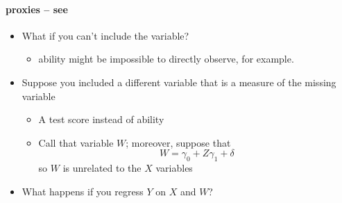 \paragraph{proxies -- see \citet[Section 12.5]{Gre12}}
\begin{itemize}
\item What if you can't include the variable?
\begin{itemize}
\item ability might be impossible to directly observe, for
            example.
\end{itemize}
\item Suppose you included a different variable that is a measure
          of the missing variable
\begin{itemize}
\item A test score instead of ability
\item Call that variable $W$; moreover, suppose that
            \[W = \gamma_0 + Z \gamma_1 + \delta\]
            so $W$ is unrelated to the $X$ variables
\end{itemize}
\item What happens if you regress $Y$ on $X$ and $W$?
\end{itemize}
